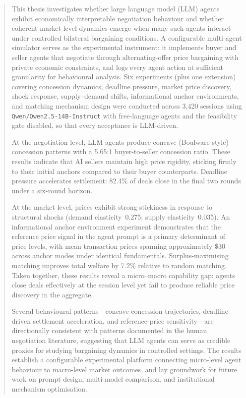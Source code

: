 \begin{abstract}
This thesis investigates whether large language model (LLM) agents exhibit economically interpretable negotiation behaviour and whether coherent market-level dynamics emerge when many such agents interact under controlled bilateral bargaining conditions.  A configurable multi-agent simulator serves as the experimental instrument: it implements buyer and seller agents that negotiate through alternating-offer price bargaining with private economic constraints, and logs every agent action at sufficient granularity for behavioural analysis.  Six experiments (plus one extension) covering concession dynamics, deadline pressure, market price discovery, shock response, supply--demand shifts, informational anchor environments, and matching mechanism design were conducted across 3,420 sessions using \texttt{Qwen/Qwen2.5-14B-Instruct} with free-language agents and the feasibility gate disabled, so that every acceptance is LLM-driven.

At the negotiation level, LLM agents produce concave (Boulware-style) concession patterns with a 5.65:1 buyer-to-seller concession ratio. These results indicate that AI sellers maintain high price rigidity, sticking firmly to their initial anchors compared to their buyer counterparts.  Deadline pressure accelerates settlement: 82.4\% of deals close in the final two rounds under a six-round horizon.  

At the market level, prices exhibit strong stickiness in response to structural shocks (demand elasticity~0.275; supply elasticity~0.035).  An informational anchor environment experiment demonstrates that the reference price signal in the agent prompt is a primary determinant of price levels, with mean transaction prices spanning approximately \$30 across anchor modes under identical fundamentals.  Surplus-maximising matching improves total welfare by 7.2\% relative to random matching.  Taken together, these results reveal a micro--macro capability gap: agents close deals effectively at the session level yet fail to produce reliable price discovery in the aggregate.

Several behavioural patterns---concave concession trajectories, deadline-driven settlement acceleration, and reference-price sensitivity---are directionally consistent with patterns documented in the human negotiation literature, suggesting that LLM agents can serve as credible proxies for studying bargaining dynamics in controlled settings. The results establish a configurable experimental platform connecting micro-level agent behaviour to macro-level market outcomes, and lay groundwork for future work on prompt design, multi-model comparison, and institutional mechanism optimisation.

\end{abstract}
